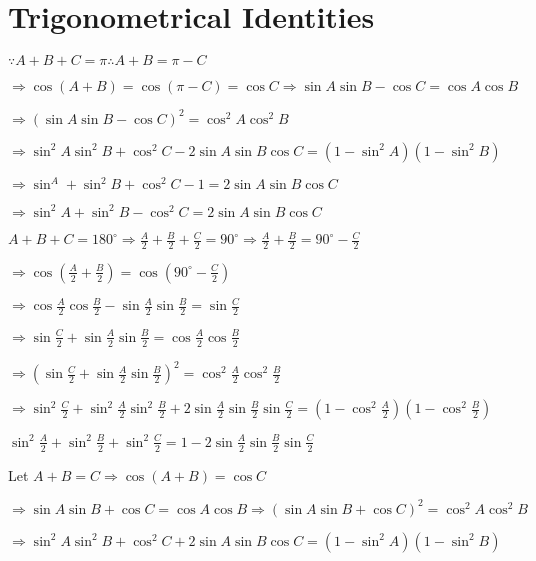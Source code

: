 \chapter{Trigonometrical Identities}
\startitemize[n, 1*broad]
\item $\because A + B + C = \pi \therefore A + B = \pi - C$

  $\Rightarrow \cos(A + B) = \cos(\pi - C) = \cos C \Rightarrow \sin A\sin B - \cos C = \cos A\cos B$

  $\Rightarrow (\sin A\sin B - \cos C)^2 = \cos^2A\cos^2B$

  $\Rightarrow \sin^2A\sin^2B + \cos^2C - 2\sin A\sin B\cos C = (1 - \sin^2A)(1 - \sin^2B)$

  $\Rightarrow \sin^A + \sin^2B + \cos^2C - 1 = 2\sin A\sin B\cos C$

  $\Rightarrow \sin^2A + \sin^2B - \cos^2C = 2\sin A\sin B\cos C$

\item $A + B + C = 180^\circ \Rightarrow \frac{A}{2} + \frac{B}{2} + \frac{C}{2} = 90^\circ \Rightarrow \frac{A}{2} +
  \frac{B}{2} = 90^\circ - \frac{C}{2}$

  $\Rightarrow \cos\left(\frac{A}{2} + \frac{B}{2}\right) = \cos\left(90^\circ - \frac{C}{2}\right)$

  $\Rightarrow \cos\frac{A}{2}\cos\frac{B}{2} - \sin\frac{A}{2}\sin\frac{B}{2} = \sin\frac{C}{2}$

  $\Rightarrow \sin\frac{C}{2} + \sin\frac{A}{2}\sin\frac{B}{2} = \cos\frac{A}{2}\cos\frac{B}{2}$

  $\Rightarrow \left(\sin\frac{C}{2} + \sin\frac{A}{2}\sin\frac{B}{2}\right)^2 = \cos^2\frac{A}{2}\cos^2\frac{B}{2}$

  $\Rightarrow \sin^2\frac{C}{2} + \sin^2\frac{A}{2}\sin^2\frac{B}{2} + 2\sin\frac{A}{2}\sin\frac{B}{2}\sin\frac{C}{2} = \left(1 -
  \cos^2\frac{A}{2}\right)\left(1 - \cos^2\frac{B}{2}\right)$

  $\sin^2\frac{A}{2} + \sin^2\frac{B}{2} + \sin^2\frac{C}{2} = 1 - 2\sin\frac{A}{2}\sin\frac{B}{2}\sin\frac{C}{2}$

\item Let $A + B = C \Rightarrow \cos(A + B) = \cos C$

  $\Rightarrow \sin A\sin B + \cos C = \cos A\cos B \Rightarrow (\sin A\sin B + \cos C)^2 = \cos^2A\cos^2B$

  $\Rightarrow \sin^2A\sin^2B + \cos^2C + 2\sin A\sin B\cos C = (1 - \sin^2A)(1 - \sin^2B)$

